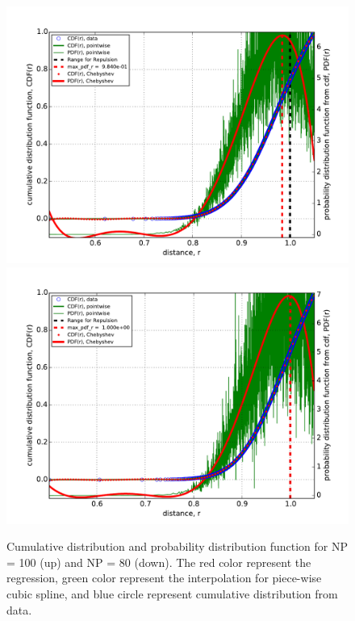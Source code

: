 \documentclass[10pt, a4paper]{report}
\begin{document}
\begin{figure}
  \centering
  \includegraphics[width=\textwidth]{figures/100_K8.pdf}
  \includegraphics[width=\textwidth]{figures/80_K8.pdf}
  \caption{Cumulative distribution and probability distribution function for NP = 100 (up) and NP = 80 (down). The red color represent the regression, green color represent the interpolation for piece-wise cubic spline, and blue circle represent cumulative distribution from data.}\label{fig:CDF_PDF_repulsion}
\end{figure}
\end{document}
